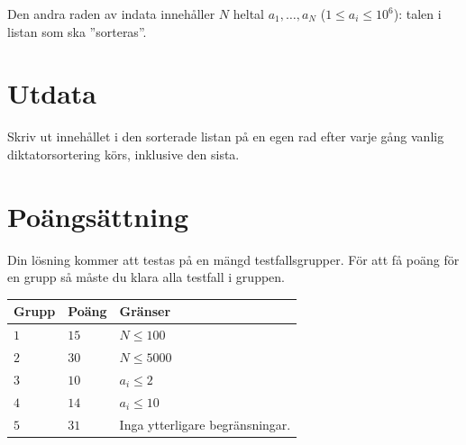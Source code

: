 Den andra raden av indata innehåller $N$ heltal $a_1, \dots, a_N$ ($1 \leq a_i \leq 10^6$):
talen i listan som ska ''sorteras''.

\section*{Utdata}
Skriv ut innehållet i den sorterade listan på en egen rad efter varje gång vanlig diktatorsortering körs,
inklusive den sista.

\section*{Poängsättning}
Din lösning kommer att testas på en mängd testfallsgrupper.
För att få poäng för en grupp så måste du klara alla testfall i gruppen.

\noindent
\begin{tabular}{| l | l | p{12cm} |}
  \hline
  \textbf{Grupp} & \textbf{Poäng} & \textbf{Gränser} \\ \hline
  $1$    & $15$   & $N \leq 100$ \\ \hline
  $2$    & $30$   & $N \leq 5000$ \\ \hline
  $3$    & $10$   & $a_i \leq 2$ \\ \hline
  $4$    & $14$   & $a_i \leq 10$ \\ \hline
  $5$    & $31$   & Inga ytterligare begränsningar. \\ \hline
\end{tabular}
